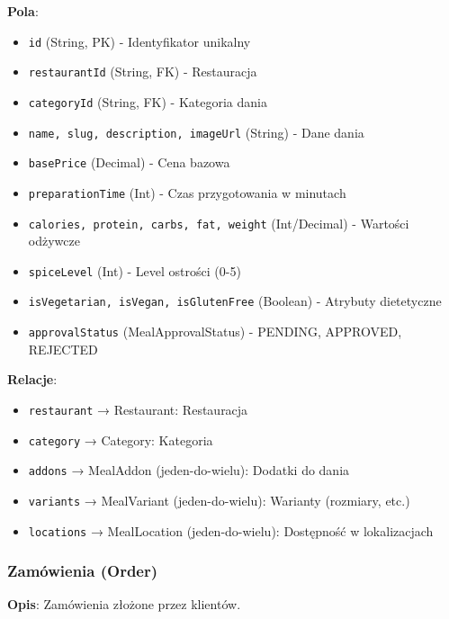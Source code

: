 \documentclass[12pt,a4paper,utf-8]{article}
\begin{document}
\textbf{Pola}:
\begin{itemize}
    \item \texttt{id} (String, PK) - Identyfikator unikalny
    \item \texttt{restaurantId} (String, FK) - Restauracja
    \item \texttt{categoryId} (String, FK) - Kategoria dania
    \item \texttt{name, slug, description, imageUrl} (String) - Dane dania
    \item \texttt{basePrice} (Decimal) - Cena bazowa
    \item \texttt{preparationTime} (Int) - Czas przygotowania w minutach
    \item \texttt{calories, protein, carbs, fat, weight} (Int/Decimal) - Wartości odżywcze
    \item \texttt{spiceLevel} (Int) - Level ostrości (0-5)
    \item \texttt{isVegetarian, isVegan, isGlutenFree} (Boolean) - Atrybuty dietetyczne
    \item \texttt{approvalStatus} (MealApprovalStatus) - PENDING, APPROVED, REJECTED
\end{itemize}

\textbf{Relacje}:
\begin{itemize}
    \item \texttt{restaurant} → Restaurant: Restauracja
    \item \texttt{category} → Category: Kategoria
    \item \texttt{addons} → MealAddon (jeden-do-wielu): Dodatki do dania
    \item \texttt{variants} → MealVariant (jeden-do-wielu): Warianty (rozmiary, etc.)
    \item \texttt{locations} → MealLocation (jeden-do-wielu): Dostępność w lokalizacjach
\end{itemize}

\subsubsection{Zamówienia (Order)}

\textbf{Opis}: Zamówienia złożone przez klientów.
\end{document}
